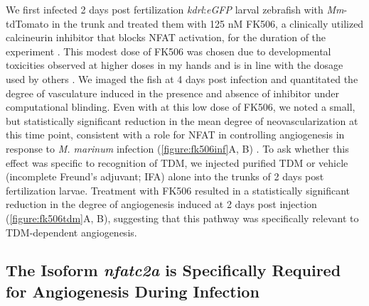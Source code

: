 We first infected 2 days post fertilization \textit{kdrl}:\textit{eGFP} larval zebrafish with \textit{Mm}-tdTomato in the trunk and treated them with 125 nM FK506, a clinically utilized calcineurin inhibitor that blocks NFAT activation, for the duration of the experiment \citep{Ellis1995}. This modest dose of FK506 was chosen due to developmental toxicities observed at higher doses in my hands and is in line with the dosage used by others \citep{Kujawski2014}. We imaged the fish at 4 days post infection and quantitated the degree of vasculature induced in the presence and absence of inhibitor under computational blinding. Even with at this low dose of FK506, we noted a small, but statistically significant reduction in the mean degree of neovascularization at this time point, consistent with a role for NFAT in controlling angiogenesis in response to \textit{M. marinum} infection (\autoref{figure:fk506inf}A, B) \citep{Kujawski2014}. To ask whether this effect was specific to recognition of TDM, we injected purified TDM or vehicle (incomplete Freund's adjuvant; IFA) alone into the trunks of 2 days post fertilization larvae. Treatment with FK506 resulted in a statistically significant reduction in the degree of angiogenesis induced at 2 days post injection (\autoref{figure:fk506tdm}A, B), suggesting that this pathway was specifically relevant to TDM-dependent angiogenesis.

\subsection{The Isoform \textit{nfatc2a} is Specifically Required for Angiogenesis During Infection}


